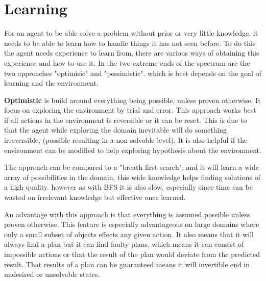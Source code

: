 \chapter{Learning}
\label{learning}
	For an agent to be able solve a problem without prior or very little knowledge, it needs to be able to learn how to handle things it has not seen before. To do this the agent needs experience to learn from, there are various ways of obtaining this experience and how to use it. In the two extreme ends of the spectrum are the two approaches "optimisic" and "pessimistic". which is best depends on the goal of learning and the environment.
	
	\textbf{Optimistic} is build around everything being possible, unless proven otherwise. It focus on exploring the environment by trial and error. This approach works best if all actions in the environment is reversible or it can be reset. This is due to that the agent while exploring the domain inevitable will do something irreversible, (possible resulting in a non solvable level). It is also helpful if the environment can be modified to help exploring hypothesis about the environment.
		
	The approach can be compared to a "breath first search", and it will learn a wide array of possibilities in the domain, this wide knowledge helps finding solutions of a high quality. however as with BFS it is also slow, especially since time can be wasted on irrelevant knowledge but effective once learned.


	An advantage with this approach is that everything is assumed possible unless proven otherwise. This feature is especially advantageous on large domains where only a small subset of objects effects any given action. It also means that it will always find a plan but it can find faulty plans, which means it can consist of impossible actions or that the result of the plan would deviate from the predicted result. That results of a plan can be guaranteed means it will invertible end in undesired or unsolvable states. 
				

		
		
